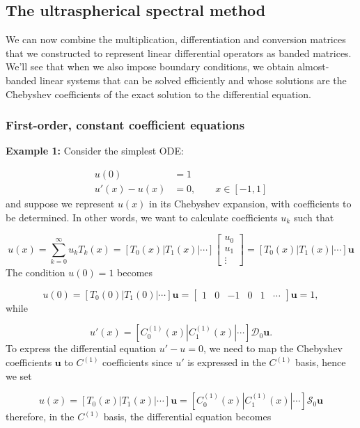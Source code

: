 \documentclass[12pt,a4paper]{article}
\begin{document}
\subsection{The ultraspherical spectral method}
We can now combine the multiplication, differentiation and conversion matrices that we constructed to represent linear differential operators as banded matrices. We'll see that when we also impose boundary conditions, we obtain almost-banded linear systems that can be solved efficiently and whose solutions are the Chebyshev coefficients of the exact solution to the differential equation.

\subsubsection{First-order, constant coefficient equations}
\textbf{Example 1:} Consider the simplest ODE:


\begin{align*}
u(0) &= 1 \\
u'(x) - u(x) &= 0, \qquad x \in [-1, 1]
\end{align*}
and suppose we represent $u(x)$ in its Chebyshev expansion, with coefficients to be determined. In other words, we want to calculate coefficients $u_k$ such that

\[
u(x) = \sum_{k=0}^\infty u_k T_k(x) = \left[ T_0(x) | T_1(x) | \cdots \right] \begin{bmatrix} u_0 \\ u_1 \\ \vdots \end{bmatrix}=  \left[ T_0(x) | T_1(x) | \cdots \right] \mathbf{u}
\]
The condition $u(0) = 1$ becomes

\[
u(0) = \left[ T_0(0) | T_1(0) | \cdots \right] \mathbf{u} = \begin{bmatrix}
1 & 0 & -1 & 0 & 1 & \cdots
\end{bmatrix}\mathbf{u} = 1,
\]
while

\[
u'(x) = \left[ C_0^{(1)}(x) | C_1^{(1)}(x) | \cdots \right]\mathcal{D}_0 \mathbf{u}.
\]
To express the differential equation $u' - u = 0$, we need to map the Chebyshev coefficients $\mathbf{u}$ to $C^{(1)}$ coefficients since $u'$ is expressed in the $C^{(1)}$ basis, hence we set

\[
u(x) = \left[ T_0(x) | T_1(x) | \cdots \right] \mathbf{u} =  \left[ C_0^{(1)}(x) | C_1^{(1)}(x) | \cdots \right]\mathcal{S}_0 \mathbf{u} 
\]
therefore, in the $C^{(1)}$  basis, the differential equation becomes
\end{document}
